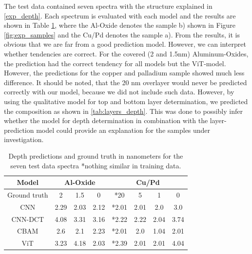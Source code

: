 The test data contained seven spectra with the structure explained in \ref{exp_depth}. Each spectrum is evaluated with each model and the results are shown in Table \ref{tab:acc_depth}, where the Al-Oxide denotes the sample b) shown in Figure \ref{fig:exp_samples} and the Cu/Pd denotes the sample a). From the results, it is obvious that we are far from a good prediction model. However, we can interpret whether tendencies are correct. For the covered (2 and 1.5nm) Aluminum-Oxides, the prediction had the correct tendency for all models but the ViT-model. However, the predictions for the copper and palladium sample showed much less difference. It should be noted, that the 20 nm overlayer would never be predicted correctly with our model, because we did not include such data. However, by using the qualitative model for top and bottom layer determination, we predicted the composition as shown in \ref{tab:layers_depth}. This was done to possibly infer whether the model for depth determination in combination with the layer-prediction model could provide an explanation for the samples under investigation.

\begin{table}[H]
    \centering
    \begin{tabular}{c|c|c|c|c|c|c|c}
        Model  &    \multicolumn{3}{|c|}{Al-Oxide}     & \multicolumn{4}{c}{Cu/Pd}            \\
        \hline
Ground truth   &       2   &   1.5   &  0   & *20   & 5    & 1     & 0                               \\
\hline
CNN            &    2.29   &  2.03  & 2.12  & *2.01  &  2.01 & 2.0   & 3.0                                \\
CNN-DCT        &    4.08   &  3.31  & 3.16  & *2.22 &  2.22 & 2.04  & 3.74                                 \\
CBAM           &    2.6    &  2.1   & 2.23  & *2.01 &  2.0  & 1.04  & 2.01                                \\
ViT            &    3.23   &  4.18  & 2.03  & *2.39 &  2.01 & 2.01  & 4.04                               \\

    \end{tabular}
    \caption{Depth predictions and ground truth in nanometers for the seven test data spectra *nothing similar in training data.}
    \label{tab:acc_depth}
\end{table}


